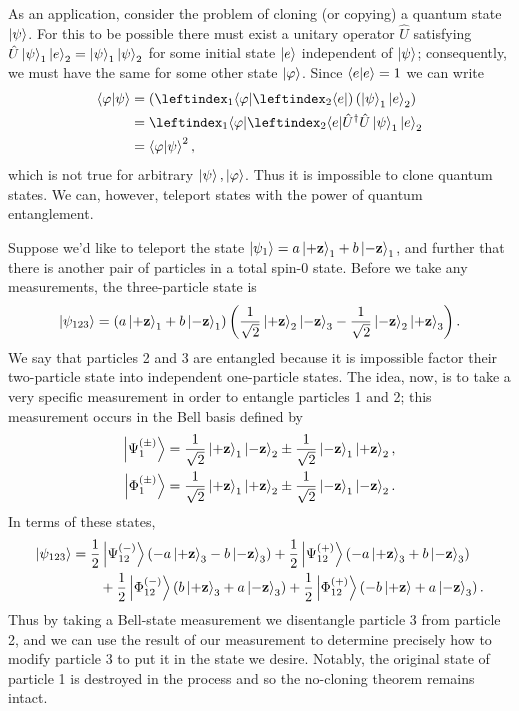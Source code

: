 \documentclass[../p116main.tex]{subfiles}
\begin{document}
As an application, consider the problem of cloning (or copying) a quantum state $\left| \psi \right>$.
For this to be possible there must exist a unitary operator $\hat U$ satisfying $\hat U \left| \psi \right>_1 \left| e \right>_2 = \left| \psi \right>_1 \left| \psi \right>_2$ for some initial state $\left| e \right>$ independent of $\left| \psi \right>$; consequently, we must have the same for some other state $\left| \varphi \right>$.
Since $\left< e \middle| e \right> = 1$ we can write
\begin{align*}
    \braket{\varphi}{\psi} &= \left( \leftindex_1{\bra{\varphi}} \leftindex_2{\bra{e}} \right) \left( \ket{\psi}_1 \ket{e}_2 \right) \\
    &= \leftindex_1{\bra{\varphi}} \leftindex_2{\bra{e}} \hat U^\dagger \hat U \ket{\psi}_1 \ket{e}_2 \\
    &= \braket{\varphi}{\psi}^2,
\end{align*}
which is not true for arbitrary $\left| \psi \right>, \left| \varphi \right>$.
Thus it is impossible to clone quantum states.
We can, however, teleport states with the power of quantum entanglement.

Suppose we'd like to teleport the state $\left| \psi_1 \right> = a \left| +\mathbf{z} \right>_1 + b\left| -\mathbf{z} \right>_1$, and further that there is another pair of particles in a total spin-0 state.
Before we take any measurements, the three-particle state is
\[ \left| \psi_{123} \right> = \left( a \left| +\mathbf{z} \right>_1 + b \left| -\mathbf{z} \right>_1 \right) \left( \frac{1}{\sqrt{2}} \left| +\mathbf{z} \right>_2 \left| -\mathbf{z} \right>_3 - \frac{1}{\sqrt{2}} \left| -\mathbf{z} \right>_2 \left| +\mathbf{z} \right>_3 \right). \]
We say that particles 2 and 3 are entangled because it is impossible factor their two-particle state into independent one-particle states.
The idea, now, is to take a very specific measurement in order to entangle particles 1 and 2; this measurement occurs in the Bell basis defined by
\begin{align*}
    \left| \Psi_1^{(\pm)} \right> &= \frac{1}{\sqrt{2}} \left| +\mathbf{z} \right>_1 \left| -\mathbf{z} \right>_2 \pm \frac{1}{\sqrt{2}} \left| -\mathbf{z} \right>_1 \left| +\mathbf{z} \right>_2, \\
    \left| \Phi_1^{(\pm)} \right> &= \frac{1}{\sqrt{2}} \left| +\mathbf{z} \right>_1 \left| +\mathbf{z} \right>_2 \pm \frac{1}{\sqrt{2}} \left| -\mathbf{z} \right>_1 \left| -\mathbf{z} \right>_2.
\end{align*}
In terms of these states,
\begin{align*}
    \left| \psi_{123} \right> &= \frac{1}{2} \left| \Psi_{12}^{(-)} \right> \left( -a \left| +\mathbf{z} \right>_3 - b \left| -\mathbf{z} \right>_3 \right) + \frac{1}{2} \left| \Psi_{12}^{(+)} \right> \left( -a \left| +\mathbf{z} \right>_3 + b \left| -\mathbf{z} \right>_3 \right) \\
    &\qquad + \frac{1}{2} \left| \Phi_{12}^{(-)} \right> \left( b \left| +\mathbf{z} \right>_3 + a\left| -\mathbf{z} \right>_3 \right) + \frac{1}{2} \left| \Phi_{12}^{(+)} \right> \left( -b \left| +\mathbf{z} \right> + a \left| -\mathbf{z} \right>_3 \right).
\end{align*}
Thus by taking a Bell-state measurement we disentangle particle 3 from particle 2, and we can use the result of our measurement to determine precisely how to modify particle 3 to put it in the state we desire.
Notably, the original state of particle 1 is destroyed in the process and so the no-cloning theorem remains intact.
\end{document}
